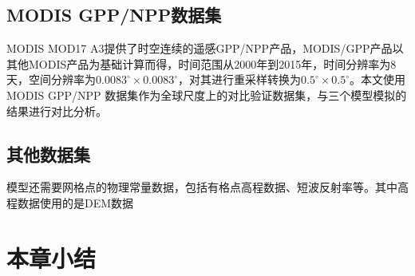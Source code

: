 \subsection{MODIS GPP/NPP数据集}
MODIS MOD17 A3提供了时空连续的遥感GPP/NPP产品，MODIS/GPP产品以其他MODIS产品为基础计算而得，时间范围从2000年到2015年，时间分辨率为8天，空间分辨率为$0.0083^{\circ} \times 0.0083^{\circ}$，对其进行重采样转换为$0.5^{\circ} \times 0.5^{\circ}$。本文使用MODIS GPP/NPP 数据集作为全球尺度上的对比验证数据集，与三个模型模拟的结果进行对比分析。

\subsection{其他数据集}
模型还需要网格点的物理常量数据，包括有格点高程数据、短波反射率等。其中高程数据使用的是DEM数据





\section{本章小结}